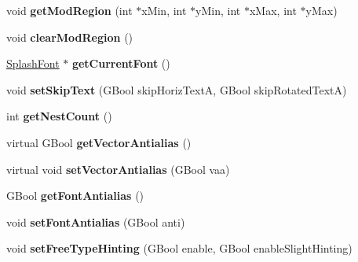 \begin{DoxyCompactItemize}
\item 
\mbox{\label{class_splash_output_dev_a503944f52feb8011ad6319efc132c240}} 
void {\bfseries get\+Mod\+Region} (int $\ast$x\+Min, int $\ast$y\+Min, int $\ast$x\+Max, int $\ast$y\+Max)
\item 
\mbox{\label{class_splash_output_dev_aff2686303ff95bf87ff43650978dfb57}} 
void {\bfseries clear\+Mod\+Region} ()
\item 
\mbox{\label{class_splash_output_dev_a450b68a49c88e79a4514b5ee821f2f24}} 
\hyperlink{class_splash_font}{Splash\+Font} $\ast$ {\bfseries get\+Current\+Font} ()
\item 
\mbox{\label{class_splash_output_dev_a909a7a5781ccd6848950f260a3603108}} 
void {\bfseries set\+Skip\+Text} (G\+Bool skip\+Horiz\+TextA, G\+Bool skip\+Rotated\+TextA)
\item 
\mbox{\label{class_splash_output_dev_a11c4184c78f7c4dcf0bf4a7ec6ee882f}} 
int {\bfseries get\+Nest\+Count} ()
\item 
\mbox{\label{class_splash_output_dev_af858c026f3a6f240475594d9cf2dbb22}} 
virtual G\+Bool {\bfseries get\+Vector\+Antialias} ()
\item 
\mbox{\label{class_splash_output_dev_a9e6206ce4eb342401ecc8c01f08b0f75}} 
virtual void {\bfseries set\+Vector\+Antialias} (G\+Bool vaa)
\item 
\mbox{\label{class_splash_output_dev_a82f88a129bcb9c397b7e16a9100e713a}} 
G\+Bool {\bfseries get\+Font\+Antialias} ()
\item 
\mbox{\label{class_splash_output_dev_a99603ea80ee75b5eeb4b1008e65e3ded}} 
void {\bfseries set\+Font\+Antialias} (G\+Bool anti)
\item 
\mbox{\label{class_splash_output_dev_a9ffa2fbe23152dcc17ee848547f6bb9a}} 
void {\bfseries set\+Free\+Type\+Hinting} (G\+Bool enable, G\+Bool enable\+Slight\+Hinting)
\end{DoxyCompactItemize}
